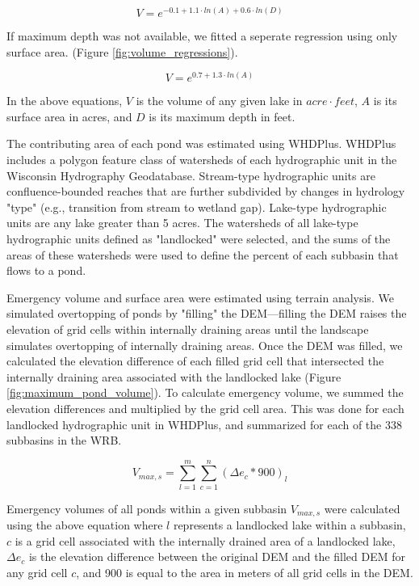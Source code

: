 \begin{equation}
V = e^{-0.1 + 1.1 \cdot ln(A) + 0.6 \cdot ln(D)} 
\end{equation}

If maximum depth was not available, we fitted a seperate regression using only surface area. (Figure \ref{fig:volume_regressions}).

\begin{equation}
V = e^{0.7 + 1.3 \cdot ln(A)} 
\end{equation}

In the above equations, $V$ is the volume of any given lake in $acre \cdot feet$, $A$ is its surface area in acres, and $D$ is its maximum depth in feet.

The contributing area of each pond was estimated using WHDPlus. WHDPlus includes a polygon feature class of watersheds of each hydrographic unit in the Wisconsin Hydrography Geodatabase. Stream-type hydrographic units are confluence-bounded reaches that are further subdivided by changes in hydrology "type" (e.g., transition from stream to wetland gap). Lake-type hydrographic units are any lake greater than 5 acres. The watersheds of all lake-type hydrographic units defined as "landlocked" were selected, and the sums of the areas of these watersheds were used to define the percent of each subbasin that flows to a pond.

Emergency volume and surface area were estimated using terrain analysis. We simulated overtopping of ponds by "filling" the DEM---filling the DEM raises the elevation of grid cells within internally draining areas until the landscape simulates overtopping of internally draining areas. Once the DEM was filled, we calculated the elevation difference of each filled grid cell that intersected the internally draining area associated with the landlocked lake (Figure \ref{fig:maximum_pond_volume}). To calculate emergency volume, we summed the elevation differences and multiplied by the grid cell area. This was done for each landlocked hydrographic unit in WHDPlus, and summarized for each of the 338 subbasins in the WRB.

\begin{equation}
V_{max,s} = \sum\limits_{l=1}^m \sum\limits_{c=1}^n (\Delta e_c * 900)_l
\end{equation}

Emergency volumes of all ponds within a given subbasin $V_{max,s}$ were calculated using the above equation where $l$ represents a landlocked lake within a subbasin, $c$ is a grid cell associated with the internally drained area of a landlocked lake, $\Delta e_c$ is the elevation difference between the original DEM and the filled DEM for any grid cell $c$, and 900 is equal to the area in meters of all grid cells in the DEM.